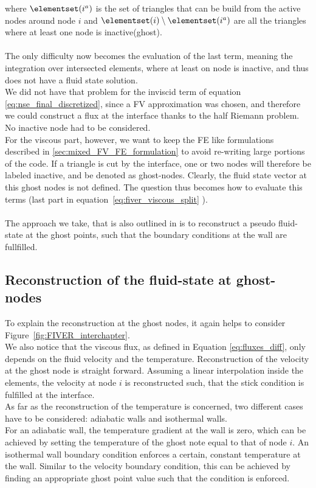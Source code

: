 \documentclass[../main.tex]{subfiles}
\begin{document}
where $\elementset(i^a)$ is the set of triangles that can be build from the active nodes around node $i$ and $\elementset(i)\setminus\elementset(i^a)$ are all the triangles where at least one node is inactive(ghost).\\
\\
The only difficulty now becomes the evaluation of the last term, meaning the integration over intersected elements, where at least on node is inactive, and thus does not have a fluid state solution.\\
We did not have that problem for the inviscid term of equation \eqref{eq:nse_final_discretized}, since a \ac{FV} approximation was chosen, and therefore we could construct a flux at the interface thanks to the half Riemann problem. No inactive node had to be considered.\\
For the viscous part, however, we want to keep the \ac{FE} like formulations described in \ref{sec:mixed_FV_FE_formulation} to avoid re-writing large portions of the code. If a triangle is cut by the interface, one or two nodes will therefore be labeled inactive, and be denoted as ghost-nodes.
Clearly, the fluid state vector at this ghost nodes is not defined. The question thus becomes how to evaluate this terms (last part in equation~\eqref{eq:fiver_viscous_split} ).\\
\\
The approach we take, that is also outlined in \cite{Farhat2014} is to reconstruct a pseudo fluid-state at the ghost points, such that the boundary conditions at the wall are fullfilled.

\subsection{Reconstruction of the fluid-state at ghost-nodes}\label{sec:ghost_node_reconstruction}

To explain the reconstruction at the ghost nodes, it again helps to consider Figure~\ref{fig:FIVER_interchapter}.\\
We also notice that the viscous flux, as defined in Equation \ref{eq:fluxes_diff}, only depends on the fluid velocity and the temperature.
Reconstruction of the velocity at the ghost node is straight forward. Assuming a linear interpolation inside the elements, the velocity at node $i$ is reconstructed such, that the stick condition is fulfilled at the interface.\\
As far as the reconstruction of the temperature is concerned, two different cases have to be considered: adiabatic walls and isothermal walls.\\
For an adiabatic wall, the temperature gradient at the wall is zero, which can be achieved by setting the temperature of the ghost note equal to that of node $i$. An isothermal wall boundary condition enforces a certain, constant temperature at the wall. Similar to the velocity boundary condition, this can be achieved by finding an appropriate ghost point value such that the condition is enforced.\\
\end{document}
